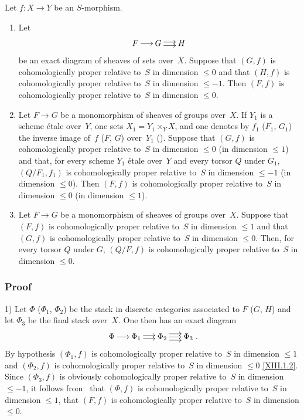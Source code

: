 \begin{proposition}
\label{XIII.1.13}
Let $f \colon X \to Y$ be an $S$-morphism.
\begin{enumerate}
\item[1)] Let
$$
\xymatrix@C=.5cm{ F \ar[r] & G \ar@<2pt>[r] \ar@<-2pt>[r] & H }
$$
be an exact diagram of sheaves of sets over~$X$. Suppose that
$(G,f)$ is cohomologically proper relative to~$S$ in
dimension $\leqslant 0$ and that $(H,f)$ is cohomologically proper
relative to~$S$ in dimension $\leqslant -1$. Then $(F,f)$ is
cohomologically proper relative to~$S$ in dimension
$\leqslant 0$.
\item[2)]
Let
$F \to G$ be a monomorphism of sheaves of groups over~$X$. If
$Y_1$ is a scheme \'etale over~$Y$, one sets $X_1 = Y_1 \times_Y
X$, and one denotes by $f_1$ (\resp $F_1$, \resp $G_1$) the inverse image of~$f$
(\resp $F$, \resp $G$) over~$Y_1$ (\cf {}). Suppose
that $(G,f)$ is cohomologically proper relative to~$S$ in
dimension $\leqslant 0$ (\resp in dimension $\leqslant 1$) and that,
for every scheme $Y_1$ \'etale over~$Y$ and every torsor $Q$
under $G_1$, $(Q/F_1, f_1)$ is cohomologically proper relative
to~$S$ in dimension $\leqslant -1$ (\resp in dimension $\leqslant
0$). Then $(F,f)$ is cohomologically proper relative to~$S$
in dimension $\leqslant 0$ (\resp in dimension $\leqslant 1$).
\item[3)] Let $F \to G$ be a monomorphism of sheaves of groups over~$X$. Suppose that $(F,f)$ is cohomologically proper relative
to~$S$ in dimension $\leqslant 1$ and that $(G,f)$ is
cohomologically proper relative to~$S$ in dimension
$\leqslant 0$. Then, for every torsor $Q$ under $G$, $(Q/F, f)$ is
cohomologically proper relative to~$S$ in dimension
$\leqslant 0$.
\end{enumerate}
\end{proposition}

\subsubsection*{Proof}
1) Let $\Phi$ (\resp $\Phi_1$, \resp $\Phi_2$) be the stack in
discrete categories associated to $F$ (\resp $G$,
\resp $H$) and let $\Phi_3$ be the final stack over~$X$. One then has an
exact diagram
$$
\xymatrix@C=.5cm{ \Phi \ar[r] & \Phi_1 \ar@<2pt>[r] \ar@<-2pt>[r] &
\Phi_2 \ar@<4pt>[r] \ar[r] \ar@<-4pt>[r] & \Phi_3 }
\text{.}
$$
By hypothesis $(\Phi_1, f)$ is cohomologically proper
relative to~$S$ in dimension $\leqslant 1$ and $(\Phi_2, f)$ is
cohomologically proper relative to~$S$ in dimension
$\leqslant 0$ \eqref{XIII.1.2}. Since $(\Phi_3, f)$ is obviously
cohomologically proper relative to~$S$ in dimension
$\leqslant -1$, it follows from~ that $(\Phi, f)$ is
cohomologically proper relative to~$S$ in dimension
$\leqslant 1$, \ie that $(F,f)$ is cohomologically proper
relative to~$S$ in dimension $\leqslant 0$.

